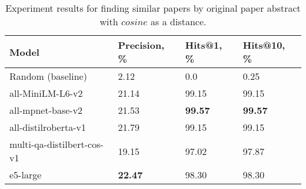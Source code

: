\begin{table*}
    \small
    \centering
    \caption{Experiment results for finding similar papers by original paper abstract with \(cosine\) as a distance.}
    \bigskip
    \begin{tabularx}{0.99\textwidth}{XIII}

        \toprule

        \bfseries Model & \bfseries Precision, \% & \bfseries Hits@1, \% & \bfseries Hits@10, \% \\

        \midrule
        
        Random (baseline)	                & 2.12  &  0.0     &    0.25 \\
        
        \midrule

        all-MiniLM-L6-v2	        & 21.14 & 99.15	   &	99.15 \\
        all-mpnet-base-v2	        & 21.53 & \bfseries 99.57 &	\bfseries 99.57 \\
        all-distilroberta-v1	    & 21.79 & 99.15	   &	99.15 \\
        multi-qa-distilbert-cos-v1	& 19.15 & 97.02	   &	97.87 \\
        e5-large	                & \bfseries 22.47 & 98.30	   &	98.30 \\

        \bottomrule

    \end{tabularx}

    \label{tab:experiments:abs-cos}
\end{table*}

